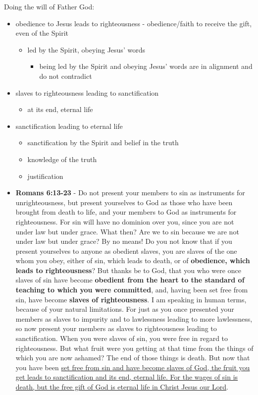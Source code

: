 \documentclass[11pt]{article}
\begin{document}
Doing the will of Father God:
\begin{itemize}
\item obedience to Jesus leads to righteousness - obedience/faith to receive the gift, even of the Spirit
\begin{itemize}
\item led by the Spirit, obeying Jesus' words
\begin{itemize}
\item being led by the Spirit and obeying Jesus' words are in alignment and do not contradict
\end{itemize}
\end{itemize}
\item slaves to righteousness leading to sanctification
\begin{itemize}
\item at its end, eternal life
\end{itemize}
\item sanctification leading to eternal life
\begin{itemize}
\item sanctification by the Spirit and belief in the truth
\item knowledge of the truth
\item justification
\end{itemize}

\item \textbf{Romans 6:13-23} - Do not present your members to sin as instruments for unrighteousness, but present yourselves to God as those who have been brought from death to life, and your members to God as instruments for righteousness.  For sin will have no dominion over you, since you are not under law but under grace.  What then? Are we to sin because we are not under law but under grace? By no means!  Do you not know that if you present yourselves to anyone as obedient slaves, you are slaves of the one whom you obey, either of sin, which leads to death, or of \textbf{obedience, which leads to righteousness}?  But thanks be to God, that you who were once slaves of sin have become \textbf{obedient from the heart to the standard of teaching to which you were committed}, and, having been set free from sin, have become \textbf{slaves of righteousness}.  I am speaking in human terms, because of your natural limitations. For just as you once presented your members as slaves to impurity and to lawlessness leading to more lawlessness, so now present your members as slaves to righteousness leading to sanctification.  When you were slaves of sin, you were free in regard to righteousness.  But what fruit were you getting at that time from the things of which you are now ashamed? The end of those things is death.  But now that you have been \uline{set free from sin and have become slaves of God, the fruit you get leads to sanctification and its end, eternal life.  For the wages of sin is death, but the free gift of God is eternal life in Christ Jesus our Lord}.
\end{itemize}
\end{document}
